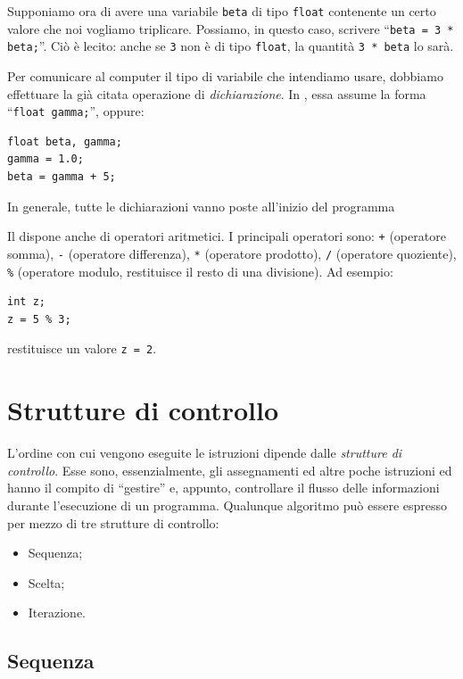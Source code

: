 Supponiamo ora di avere una variabile \lstinline!beta! di tipo \lstinline!float! contenente un certo valore che noi vogliamo triplicare.
Possiamo, in questo caso, scrivere ``\lstinline!beta = 3 * beta;!''.
Ciò è lecito: anche se \lstinline!3! non è di tipo \lstinline!float!, la quantità \lstinline!3 * beta! lo sarà. 

Per  comunicare al computer il tipo di variabile che intendiamo usare, dobbiamo effettuare la già citata operazione di \emph{dichiarazione}.
In , essa assume la forma ``\lstinline!float gamma;!'', oppure:
\begin{lstlisting}
float beta, gamma;
gamma = 1.0;
beta = gamma + 5;
\end{lstlisting}
In generale, tutte le dichiarazioni vanno poste all'inizio del programma

Il  dispone anche di operatori aritmetici. I  principali operatori sono: \lstinline!+! (operatore somma), \lstinline!-! (operatore differenza), \lstinline!*! (operatore prodotto), \lstinline!/! (operatore quoziente), \lstinline!%! (operatore modulo, restituisce il resto di una divisione). Ad esempio:
\begin{lstlisting}
int z;
z = 5 % 3;
\end{lstlisting}
restituisce un valore \lstinline!z = 2!.

	\section{Strutture di controllo}
	\label{sec:ContStruc}
L'ordine con cui vengono eseguite le istruzioni dipende dalle \emph{strutture di controllo}.
Esse sono, essenzialmente, gli assegnamenti ed altre poche istruzioni ed hanno il compito di ``gestire'' e, appunto, controllare il flusso delle informazioni durante l'esecuzione di un programma.
Qualunque algoritmo può essere espresso per mezzo di tre strutture di controllo:
\begin{itemize}
	\item
Sequenza;
	\item
Scelta;
	\item
Iterazione.
\end{itemize}

		\subsection{Sequenza}

